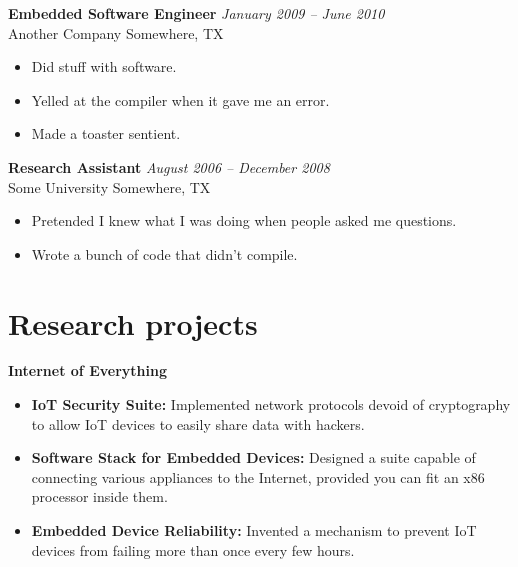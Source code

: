 \documentclass[10pt]{article}
\makeatletter
\newcommand\cdotfill{\leavevmode\cleaders\hb@xt@.33em{\hss.\hss}\hfill\kern\z@}
\newcommand\vbar{\raisebox{.15em}{\resizebox{0.9em}{0.6em}{~\textpipe~\,\,}}}
\newcommand\hdotfill{\small\normalfont~\textls[-50]{\cdotfill}}
\makeatother
\begin{document}
\vspace{0.5em}

{\bf Embedded Software Engineer} \hfill {\sl January 2009 -- June 2010} \\
Another Company \vbar Somewhere, TX

\begin{itemize}

\item Did stuff with software.

\item Yelled at the compiler when it gave me an error.

\item Made a toaster sentient.

\end{itemize}

\vspace{0.5em}

{\bf Research Assistant} \hfill {\sl August 2006 -- December 2008} \\
Some University \vbar Somewhere, TX

\begin{itemize}

\item Pretended I knew what I was doing when people asked me questions.

\item Wrote a bunch of code that didn't compile.

\end{itemize}

\vspace{0.5em}

\pagebreak

\section{Research projects\hdotfill}

{\bf Internet of Everything}

\begin{itemize}
\setlength\itemsep{2pt}

\item
\textbf{IoT Security Suite:}
Implemented network protocols devoid of cryptography to allow IoT devices to easily share data with hackers.

\item
\textbf{Software Stack for Embedded Devices:}
Designed a suite capable of connecting various appliances to the Internet, provided you can fit an x86 processor inside them.

\item
\textbf{Embedded Device Reliability:}
Invented a mechanism to prevent IoT devices from failing more than once every few hours.

\end{itemize}
\end{document}
